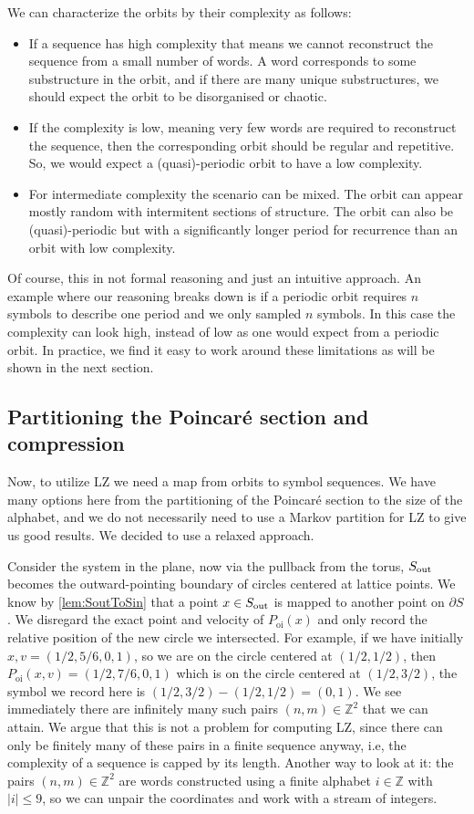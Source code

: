 We can characterize the orbits by their complexity as follows:

\begin{itemize}
\item If a sequence has high complexity that means we cannot reconstruct the sequence from a small number of words. A word corresponds to some substructure in the orbit, and if there are many unique substructures, we should expect the orbit to be disorganised or chaotic.
\item If the complexity is low, meaning very few words are required to reconstruct the sequence, then the corresponding orbit should be regular and repetitive. So, we would expect a (quasi)-periodic orbit to have a low complexity.
\item For intermediate complexity the scenario can be mixed. The orbit can appear mostly random with intermitent sections of structure. The orbit can also be (quasi)-periodic but with a significantly longer period for recurrence than an orbit with low complexity.
\end{itemize}
Of course, this in not formal reasoning and just an intuitive approach. An example where our reasoning breaks down is if a periodic orbit requires $n$ symbols to describe one period and we only sampled $n$ symbols. In this case the complexity can look high, instead of low as one would expect from a periodic orbit. In practice, we find it easy to work around these limitations as will be shown in the next section.

\subsection{Partitioning the Poincar\'e section and compression}

Now, to utilize LZ we need a map from orbits to symbol sequences. We have many options here from the partitioning of the Poincar\'e section to the size of the alphabet, and we do not necessarily need to use a Markov partition for LZ to give us good results. We decided to use a relaxed approach.

Consider the system in the plane, now via the pullback from the torus, $S_\text{out}$ becomes the outward-pointing boundary of circles centered at lattice points. We know by \cref{lem:SoutToSin} that a point $x\in S_\text{out}$ is mapped to another point on $\partial S$. We disregard the exact point and velocity of $P_\text{oi}(x)$ and only record the relative position of the new circle we intersected. For example, if we have initially $x,v = (1/2,5/6,0,1)$, so we are on the circle centered at $(1/2,1/2)$, then $P_\text{oi}(x,v)=(1/2,7/6,0,1)$ which is on the circle centered at $(1/2,3/2)$, the symbol we record here is $(1/2,3/2)-(1/2,1/2)=(0,1)$. We see immediately there are infinitely many such pairs $(n,m)\in\mathbb Z^2$ that we can attain. We argue that this is not a problem for computing LZ, since there can only be finitely many of these pairs in a finite sequence anyway, i.e, the complexity of a sequence is capped by its length. Another way to look at it: the pairs $(n,m)\in\mathbb Z^2$ are words constructed using a finite alphabet $i\in\mathbb Z$ with $|i|\le 9$, so we can unpair the coordinates and work with a stream of integers.

